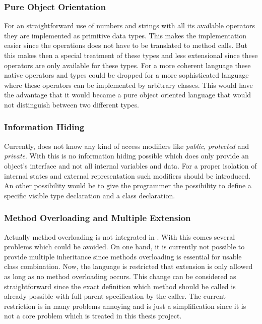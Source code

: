 \subsubsection{Pure Object Orientation}
For an straightforward use of numbers and strings with all its available
operators they are implemented as primitive data types. This makes the 
implementation easier since the operations does not have to be translated
to method calls. But this makes then a special treatment of these types
and less extensional since these operators are only available for these 
types. For a more coherent language these native operators and types could
be dropped for a more sophisticated language where these operators can be
implemented by arbitrary classes. This would have the advantage that it
would became a pure object oriented language that would not distinguish
between two different types.

\subsubsection{Information Hiding}
Currently, \ooplss does not know any kind of access modifiers like
\emph{public}, \emph{protected} and \emph{private}. With this is no
information hiding possible which does only provide an object's interface
and not all internal variables and data. For a proper isolation of
internal states and external representation such modifiers should be
introduced. An other possibility would be to give the programmer the
possibility to define a specific visible type declaration and a class
declaration.

\subsubsection{Method Overloading and Multiple Extension}
Actually method overloading is not integrated in \ooplss. With this
comes several problems which could be avoided. On one hand, it is currently
not possible to provide multiple inheritance since methods overloading is
essential for usable class combination. Now, the language is restricted
that extension is only allowed as long as no method overloading occurs.
This change can be considered as straightforward since the exact definition
which method should be called is already possible with full parent
specification by the caller. The current restriction is in many problems
annoying and is just a simplification since it is not a core problem which
is treated in this thesis project.

